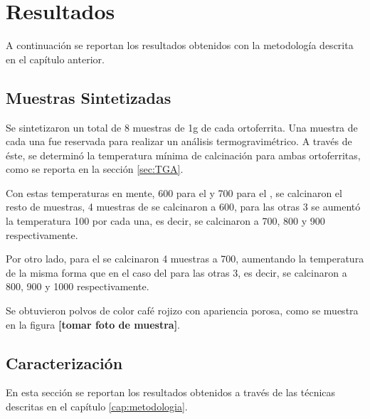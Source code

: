 \documentclass[../main.tex]{subfiles}
\begin{document}
\chapter{Resultados}
A continuación se reportan los resultados obtenidos con la metodología descrita en el capítulo anterior.
\section{Muestras Sintetizadas} \label{sec:sintesis}
Se sintetizaron un total de 8 muestras de 1g de cada ortoferrita. Una muestra de cada una fue reservada para realizar un análisis termogravimétrico. A través de éste, se determinó la temperatura mínima de calcinación para ambas ortoferritas, como se reporta en la sección \ref{sec:TGA}.

Con estas temperaturas en mente, 600\gradoC{} para el \neod{} y 700\gradoC{} para el \sama{}, se calcinaron el resto de muestras, 4 muestras de \neod{} se calcinaron a 600\gradoC{}, para las otras 3 se aumentó la temperatura 100\gradoC{} por cada una, es decir, se calcinaron a 700, 800 y 900\gradoC{} respectivamente.

Por otro lado, para el \sama{} se calcinaron 4 muestras a 700\gradoC{}, aumentando la temperatura de la misma forma que en el caso del \neod{} para las otras 3, es decir, se calcinaron a 800, 900 y 1000\gradoC{} respectivamente.

Se obtuvieron polvos de color café rojizo con apariencia porosa, como se muestra en la figura \textbf{[tomar foto de muestra]}.
\section{Caracterización}
En esta sección se reportan los resultados obtenidos a través de las técnicas descritas en el capítulo \ref{cap:metodologia}.
\end{document}
